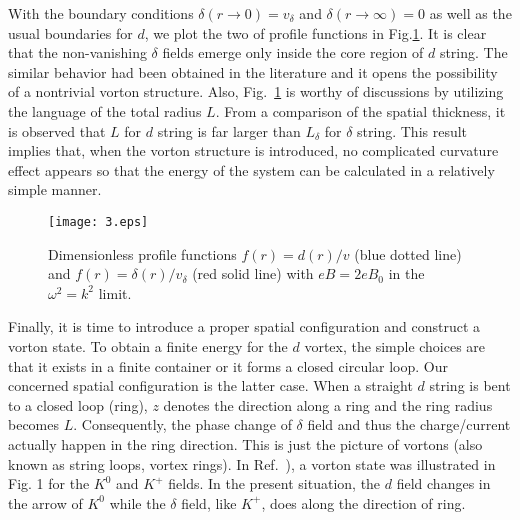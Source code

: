 \documentclass[prd, showpacs,nofootinbib,amsmath,amssymb]{revtex4}
\begin{document}
With the boundary conditions $\delta(r \rightarrow 0) = v_\delta$ and $\delta(r \rightarrow \infty) = 0$
as well as the usual boundaries for $d$, we plot the two of profile functions in Fig.\ref{fig:3}.
It is clear that the non-vanishing $\delta$ fields emerge only inside the core region of $d$ string.
The similar behavior had been obtained in the literature and it opens the possibility of a nontrivial
vorton structure. Also, Fig.~\ref{fig:3} is worthy of discussions by utilizing the language of the
total radius $L$.
From a comparison of the spatial thickness, it is observed that $L$ for $d$ string is far larger than
$L_\delta$ for $\delta$ string. This result implies that, when the vorton structure is introduced, no
complicated curvature effect appears so that the energy of the system can be calculated in a relatively
simple manner.

\begin{figure}
	\texttt{[image: 3.eps]}
	\caption{Dimensionless profile functions $f(r)=d(r)/v$ (blue dotted line) and
     $f(r)=\delta(r)/v_\delta$ (red solid line) with $eB= 2 eB_0$ in the $\omega^2 = k^2$ limit.
     }
	\label{fig:3}
\end{figure}

Finally, it is time to introduce a proper spatial configuration and construct a vorton state.
To obtain a finite energy for the $d$ vortex, the simple choices are that it exists in a finite
container or it forms a closed circular loop.
Our concerned spatial configuration is the latter case. When a straight $d$ string is bent to a
closed loop (ring), $z$ denotes the direction along a ring and the ring radius becomes $L$.
Consequently, the phase change of $\delta$ field and thus the charge/current actually happen in
the ring direction. This is just the picture of vortons (also known as string loops, vortex rings).
In Ref.~\cite{bedaque2011vortons}), a vorton state was illustrated in Fig. 1 for the $K^0$ and
$K^+$ fields. In the present situation, the $d$ field changes in the arrow of $K^0$ while the
$\delta$ field, like $K^+$, does along the direction of ring.
\end{document}
